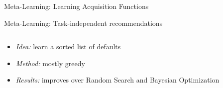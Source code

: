 \begin{frame}[c]{Meta-Learning: Learning Acquisition Functions}
	

\end{frame}

\begin{frame}[c]{Meta-Learning: Task-independent recommendations}



\begin{columns}[T] %
\begin{column}{.48\textwidth}

    \begin{itemize}
        \item<1-7> \emph{Idea:} learn a sorted list of defaults
        \item<2-7> \emph{Method:} mostly greedy 
        \item<3-7> \emph{Results:} improves over Random Search and Bayesian Optimization
    \end{itemize}

    

\end{column}%


\end{columns}
\end{frame}
